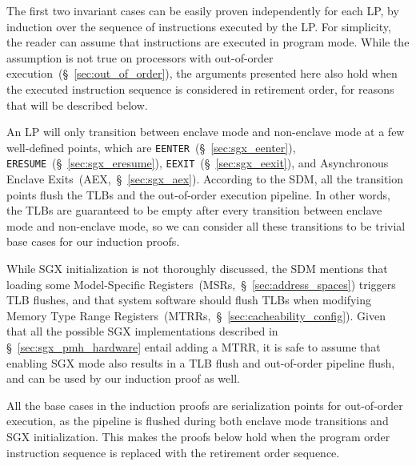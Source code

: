 The first two invariant cases can be easily proven independently for each LP,
by induction over the sequence of instructions executed by the LP. For
simplicity, the reader can assume that instructions are executed in program
mode. While the assumption is not true on processors with out-of-order
execution~(\S~\ref{sec:out_of_order}), the arguments presented here also hold
when the executed instruction sequence is considered in retirement order, for
reasons that will be described below.


An LP will only transition between enclave mode and non-enclave mode at a few
well-defined points, which are \texttt{EENTER}~(\S~\ref{sec:sgx_eenter}),
\texttt{ERESUME}~(\S~\ref{sec:sgx_eresume}),
\texttt{EEXIT}~(\S~\ref{sec:sgx_eexit}),
and Asynchronous Enclave Exits~(AEX,~\S~\ref{sec:sgx_aex}). According to the
SDM, all the transition points flush the TLBs and the out-of-order execution
pipeline. In other words, the TLBs are guaranteed to be empty after every
transition between enclave mode and non-enclave mode, so we can consider all
these transitions to be trivial base cases for our induction proofs.

While SGX initialization is not thoroughly discussed, the SDM mentions that
loading some Model-Specific Registers~(MSRs,~\S~\ref{sec:address_spaces})
triggers TLB flushes, and that system software should flush TLBs when modifying
Memory Type Range Registers~(MTRRs,~\S~\ref{sec:cacheability_config}). Given
that all the possible SGX implementations described in
\S~\ref{sec:sgx_pmh_hardware} entail adding a MTRR, it is safe to assume that
enabling SGX mode also results in a TLB flush and out-of-order pipeline flush,
and can be used by our induction proof as well.

All the base cases in the induction proofs are serialization points for
out-of-order execution, as the pipeline is flushed during both enclave mode
transitions and SGX initialization. This makes the proofs below hold when the
program order instruction sequence is replaced with the retirement order
sequence.

